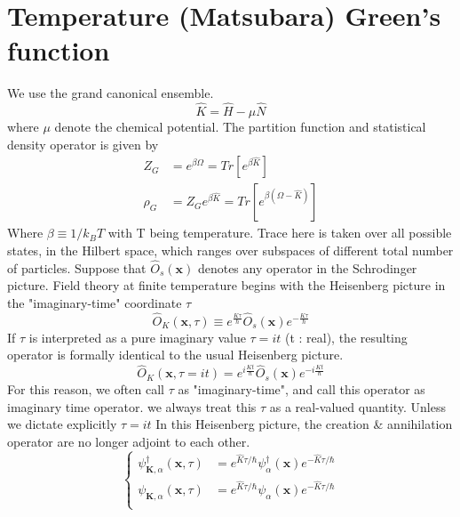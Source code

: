 \section{Temperature (Matsubara) Green's function}

We use the grand canonical ensemble.
$$\hat{K}=\hat{H}-\mu\hat{N}$$
where $\mu$ denote the chemical potential.
The partition function and statistical density operator is given by
\begin{align}
Z_{G} & =e^{\beta\Omega}=Tr[e^{\beta \hat{K}}] \\
\rho_{G} & =Z_{G}e^{\beta\hat{K}}=Tr[e^{\beta (\Omega-\hat{K})}]
\end{align}
Where $\beta \equiv 1/k_{B}T$ with T being temperature.
Trace here is taken over all possible states, in the Hilbert space, which ranges over subspaces of different total number of particles.
Suppose that $\hat{O}_{s}(\mathbf{x})$ denotes any operator in the Schrodinger picture.
Field theory at finite temperature begins with the Heisenberg picture in the "imaginary-time" coordinate $\tau$
\begin{equation}
\hat{O}_{K}(\mathbf{x},\tau)\equiv e^{\frac{K\tau}{\hbar}}\hat{O}_s(\mathbf{x})e^{-\frac{K\tau}{\hbar}}
\end{equation}
If $\tau$ is interpreted as a pure imaginary value $\tau=it$ (t : real), the resulting operator is formally identical to the usual Heisenberg picture.
$$\hat{O}_{K}(\mathbf{x},\tau=it)= e^{i\frac{Kt}{\hbar}}\hat{O}_s(\mathbf{x})e^{-i\frac{Kt}{\hbar}}$$
For this reason, we often call $\tau$ as "imaginary-time", and call this operator as imaginary time operator.
 we always treat this $\tau$ as a real-valued quantity. Unless we dictate explicitly $\tau=it$
In this Heisenberg picture, the creation \& annihilation operator are no longer adjoint to each other.
\begin{equation}
\left\{
\begin{aligned}
\psi^{\dagger}_{\mathbf{K},\alpha}(\mathbf{x},\tau) &=e^{\hat{K}\tau/\hbar}\psi^{\dagger}_{\alpha}(\mathbf{x})e^{-\hat{K}\tau/\hbar}\\
\psi_{\mathbf{K},\alpha}(\mathbf{x},\tau) &=e^{\hat{K}\tau/\hbar}\psi_{\alpha}(\mathbf{x})e^{-\hat{K}\tau/\hbar}\\
\end{aligned}
\right.
\end{equation}
